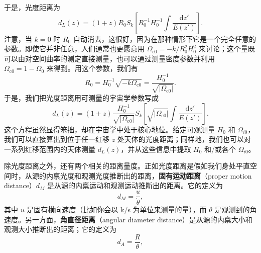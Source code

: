 于是，光度距离为
\begin{equation*}
d_L(z) = (1+z)R_0S_k\left[R_0^{-1}H_0^{-1}\int\frac{\mathrm{d}z'}{E(z')}\right].
\tag{8.121}
\end{equation*}
注意，当 $k=0$ 时 $R_0$ 自动消去，这很好，因为在那种情形下它是一个完全任意的参数。即使它并非任意，人们通常也更愿意用 $\Omega_{\mathrm{c}0}=-k/R_0^{2}H_0^{2}$ 来讨论；这个量既可以由对空间曲率的测定直接测量，也可以通过测量密度参数并利用 $\Omega_{\mathrm{c}0}=1-\Omega_0$ 来得到。用这个参数，我们有
\begin{equation*}
R_0 = H_0^{-1}\sqrt{-k\Omega_{\mathrm{c}0}} = \frac{H_0^{-1}}{\sqrt{|\Omega_{\mathrm{c}0}|}}.
\tag{8.122}
\end{equation*}
于是，我们把光度距离用可测量的宇宙学参数写成
\begin{equation*}
\boxed{\,d_L(z) = (1+z)\frac{H_0^{-1}}{\sqrt{|\Omega_{\mathrm{c}0}|}}S_k\left[\sqrt{|\Omega_{\mathrm{c}0}|}\int\frac{\mathrm{d}z'}{E(z')}\right].\,}
\tag{8.123}
\end{equation*}
这个方程虽然显得笨拙，却在宇宙学中处于核心地位。给定可观测量 $H_0$ 和 $\Omega_{i0}$，我们可以直接算出到位于任一红移 $z$ 处天体的光度距离；同样地，我们也可以对一系列红移范围内的天体测量 $d_L(z)$，并从这些信息中提取 $H_0$ 和/或各个 $\Omega_{i0}$。

除光度距离之外，还有两个相关的距离量度。正如光度距离是假如我们身处平直空间时，从源的内禀光度和观测光度推断出的距离，\textbf{固有运动距离}（proper motion distance）$d_M$ 是从源的内禀运动和观测运动推断出的距离。它的定义为
\begin{equation*}
d_M = \frac{u}{\dot{\theta}},
\tag{8.124}
\end{equation*}
其中 $u$ 是固有横向速度（比如你会以 k/s 为单位来测量的量），而 $\dot{\theta}$ 是观测到的角速度。另一方面，\textbf{角直径距离}（angular diameter distance）是从源的内禀大小和观测大小推断出的距离；它的定义为
\begin{equation*}
d_A = \frac{R}{\theta},
\tag{8.125}
\end{equation*}
